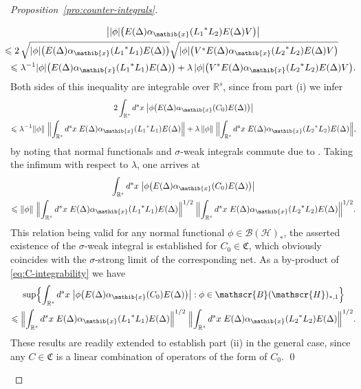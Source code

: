 \documentclass[a4paper,a4paper]{article}
\numberwithin{equation}{section}
\newcommand{\Cfrak}{\mathfrak{C}}
\newcommand{\Rs}{\mathbb{R}^s}
\newcommand{\BH}{\mathscr{B} ( \mathscr{H} )}
\newcommand{\ED}{E ( \Delta )}
\newcommand{\aibx}{\alpha_\mathib{x}}
\newcounter{proofitem}
\newenvironment{prooflist}{\begin{list}{(\roman{proofitem})}%
  {\usecounter{proofitem} \setlength{\topsep}{0ex}%
   \setlength{\parsep}{0.2ex} \setlength{\itemsep}{0.4ex}%
   \setlength{\leftmargin}{0em} \setlength{\itemindent}{0.5em}%
   \setlength{\listparindent}{1em}}}{\qed \end{list}}
\theoremstyle{definition}
\theoremstyle{plain}
\theoremstyle{remark}
\newcommand{\Bset}[1]{\Bigl\{ #1 \Bigr\}}
\newcommand{\abs}[1]{\lvert #1 \rvert}
\newcommand{\babs}[1]{\bigl\lvert #1 \bigr\rvert}
\newcommand{\norm}[1]{\lVert #1 \rVert}
\newcommand{\Bnorm}[1]{\Bigl\lVert #1 \Bigr\rVert}
\begin{document}
\begin{proof}[Proposition~\ref{pro:counter-integrals}]
\begin{prooflist}
\begin{multline*}
        \babs{\abs{\phi} \bigl( \ED \aibx ( {L_1}^* L_2 ) \ED V
        \bigr)} \\
        \mspace{-45mu} \leqslant 2 \, \sqrt{\abs{\phi} \bigl( \ED
        \aibx ( {L_1}^* L_1 ) \ED \bigr)} \sqrt{\abs{\phi} \bigl( V^*
        \ED \aibx ( {L_2}^* L_2 ) \ED V \bigr)} \\
        \leqslant \lambda^{-1} \abs{\phi} \bigl( \ED \aibx ( {L_1}^*
        L_1 ) \ED \bigr) + \lambda \, \abs{\phi} \bigl( V^* \ED \aibx
        ( {L_2}^* L_2 ) \ED V \bigr) \text{.}
      \end{multline*}
      Both sides of this inequality are integrable over $\Rs$, since
      from part (i) we infer
      \begin{multline*}
        2 \int_{\Rs} d^s x \; \babs{\phi \bigl(\ED \aibx ( C_0 ) \ED
        \bigr)} \\
        \leqslant \lambda^{-1} \norm{\phi} \; \Bnorm{\int_{\Rs} d^s x
        \; \ED \aibx ( {L_1}^* L_1 ) \ED} + \lambda \, \norm{\phi} \;
        \Bnorm{\int_{\Rs}d^s x \; \ED \aibx ( {L_2}^* L_2 ) \ED}
        \text{,}
      \end{multline*}
      by noting that normal functionals and $\sigma$-weak integrals
      commute due to \cite[Proposition~II.5.7 adapted to integrals in
      locally convex spaces]{fell/doran:1988a}. Taking the infimum
      with respect to $\lambda$, one arrives at
      \begin{multline}
        \label{eq:C-integrability}
        \int_{\Rs} d^s x \; \babs{\phi \bigl( \ED \aibx ( C_0 ) \ED
        \bigr)} \\
        \leqslant \norm{\phi} \; \Bnorm{\int_{\Rs} d^s x \; \ED \aibx (
        {L_1}^* L_1 ) \ED}^{1/2} \; \Bnorm{\int_{\Rs}d^s x \; \ED \aibx (
        {L_2}^* L_2 ) \ED}^{1/2} \text{.}
      \end{multline}
      This relation being valid for any normal functional $\phi \in
      \BH_*$, the asserted existence of the $\sigma$-weak integral is
      established for $C_0 \in \Cfrak$, which obviously coincides with
      the $\sigma$-strong limit of the corresponding net. As a
      by-product of \eqref{eq:C-integrability} we have
      \begin{multline}
        \label{eq:supremum-estimate-prepared}
        \sup \Bset{\int_{\Rs} d^s x \; \babs{\phi \bigl( \ED \aibx (
        C_0 ) \ED \bigr)} : \phi \in \BH_{*,1}} \\
        \leqslant \Bnorm{\int_{\Rs} d^s x \; \ED \aibx ( {L_1}^* L_1 )
        \ED}^{1/2} \; \Bnorm{\int_{\Rs}d^s x \; \ED \aibx ( {L_2}^*
        L_2 ) \ED}^{1/2} \text{.}
      \end{multline}
      These results are readily extended to establish part (ii) in
      the general case, since any $C \in \Cfrak$ is a linear
      combination of operators of the form of $C_0$.
    \end{prooflist}
    \renewcommand{\qed}{}
  \end{proof}
\end{document}
